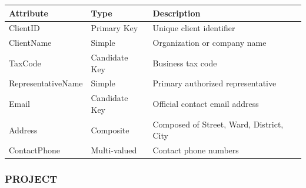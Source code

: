 \documentclass[a4paper,12pt]{report}
\newcounter{none} %
\begin{document}
{\def\LTcaptype{none} %
\begin{longtable}[]{@{}
  >{\raggedright\arraybackslash}p{}
  >{\raggedright\arraybackslash}p{}
  >{\raggedright\arraybackslash}p{}@{}}
\toprule\noalign{}
\begin{minipage}[b]{\linewidth}\raggedright
Attribute
\end{minipage} & \begin{minipage}[b]{\linewidth}\raggedright
Type
\end{minipage} & \begin{minipage}[b]{\linewidth}\raggedright
Description
\end{minipage} \\
\midrule\noalign{}
\endhead
\bottomrule\noalign{}
\endlastfoot
ClientID & Primary Key & Unique client identifier \\
ClientName & Simple & Organization or company name \\
TaxCode & Candidate Key & Business tax code \\
RepresentativeName & Simple & Primary authorized representative \\
Email & Candidate Key & Official contact email address \\
Address & Composite & Composed of Street, Ward, District, City \\
ContactPhone & Multi-valued & Contact phone numbers \\
\end{longtable}
}

\subsubsection{PROJECT}\label{project}
\end{document}
